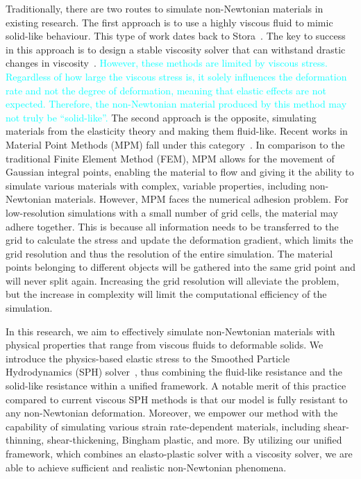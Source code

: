 \documentclass[10pt,journal,compsoc]{IEEEtran}
\newcommand{\revised}[1]{{\textcolor{cyan}{#1}}}
\begin{document}
Traditionally, there are two routes to simulate non-Newtonian materials in existing research. The first approach is to use a highly viscous fluid to mimic solid-like behaviour. This type of work dates back to Stora~\cite{Stora1999}. The key to success in this approach is to design a stable viscosity solver that can withstand drastic changes in viscosity~\cite{Peer2015,Goldade2019-Adaptive-Octree-Viscosity}. \revised{However, these methods are limited by viscous stress. Regardless of how large the viscous stress is, it solely influences the deformation rate and not the degree of deformation,  meaning that elastic effects are not expected.
Therefore, the non-Newtonian material produced by this method may not truly be “solid-like”.} The second approach is the opposite, simulating materials from the elasticity theory and making them fluid-like. Recent works in Material Point Methods (MPM) fall under this category~\cite{Stomakhin2014,Su2021}. In comparison to the traditional Finite Element Method (FEM), MPM allows for the movement of Gaussian integral points, enabling the material to flow and giving it the ability to simulate various materials with complex, variable properties, including non-Newtonian materials. However, MPM faces the numerical adhesion problem. For low-resolution simulations with a small number of grid cells, the material may adhere together. This is because all information needs to be transferred to the grid to calculate the stress and update the deformation gradient, which limits the grid resolution and thus the resolution of the entire simulation. The material points belonging to different objects will be gathered into the same grid point and will never split again. Increasing the grid resolution will alleviate the problem, but the increase in complexity will limit the computational efficiency of the simulation.

In this research, we aim to effectively simulate non-Newtonian materials with physical properties that range from viscous fluids to deformable solids. We introduce the physics-based elastic stress to the Smoothed Particle Hydrodynamics (SPH) solver~\cite{koschier2022survey}, thus combining the fluid-like resistance and the solid-like resistance within a unified framework. A notable merit of this practice compared to current viscous SPH methods is that our model is fully resistant to any non-Newtonian deformation. Moreover, we empower our method with the capability of simulating various strain rate-dependent materials, including shear-thinning, shear-thickening, Bingham plastic, and more. By utilizing our unified framework, which combines an elasto-plastic solver with a viscosity solver, we are able to achieve sufficient and realistic non-Newtonian phenomena.
\end{document}
